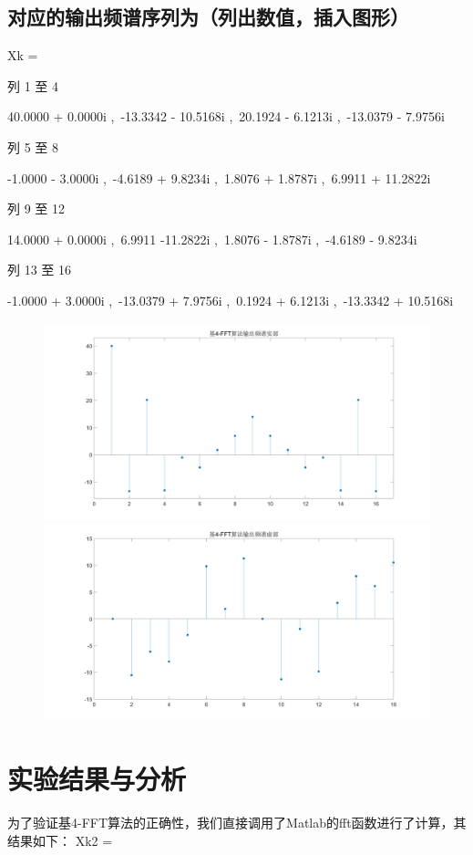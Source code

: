 \documentclass{../source/Experiment}
\begin{document}
\subsection{对应的输出频谱序列为（列出数值，插入图形）}
Xk =

列 1 至 4

40.0000 + 0.0000i ,\, -13.3342 - 10.5168i ,\, 20.1924 - 6.1213i ,\, -13.0379 - 7.9756i

列 5 至 8

-1.0000 - 3.0000i ,\, -4.6189 + 9.8234i ,\, 1.8076 + 1.8787i ,\, 6.9911 + 11.2822i

列 9 至 12

14.0000 + 0.0000i ,\, 6.9911 -11.2822i ,\, 1.8076 - 1.8787i ,\, -4.6189 - 9.8234i

列 13 至 16

-1.0000 + 3.0000i ,\, -13.0379 + 7.9756i ,\, 0.1924 + 6.1213i ,\, -13.3342 + 10.5168i

\begin{figure}[H]
    \centering
    \includegraphics[width = 1.0\textwidth]{src/exp3_2.png}
    \includegraphics[width = 1.0\textwidth]{src/exp3_3.png}
\end{figure}
\section{实验结果与分析}
为了验证基4-FFT算法的正确性，我们直接调用了Matlab的fft函数进行了计算，其结果如下：
Xk2 =
\end{document}
